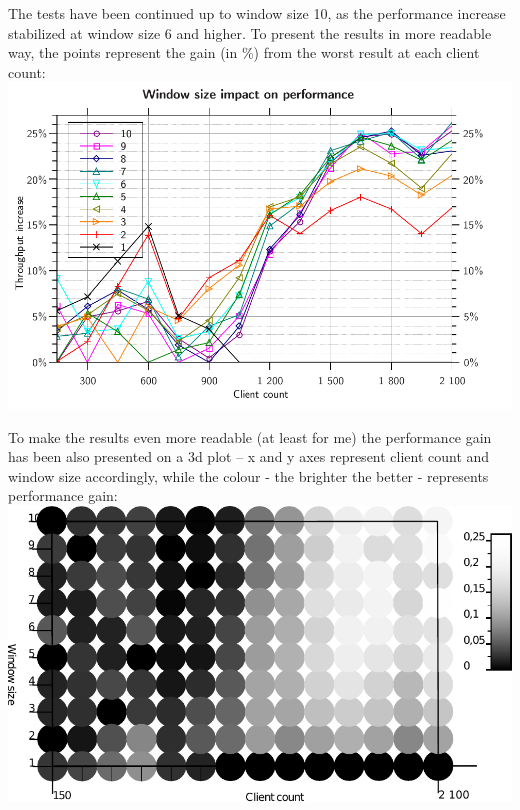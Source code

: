 The tests have been continued up to window size 10, as the performance increase stabilized at window size 6 and higher.
To present the results in more readable way, the points represent the gain (in \%) from the worst result at each client count:\\
\includegraphics{varia/ws_2d.pdf}

To make the results even more readable (at least for me) the performance gain has been also presented on a 3d plot -- x and y axes represent client count and window size accordingly, while the colour - the brighter the better - represents performance gain:\\
\includegraphics{varia/ws_3d.pdf}


